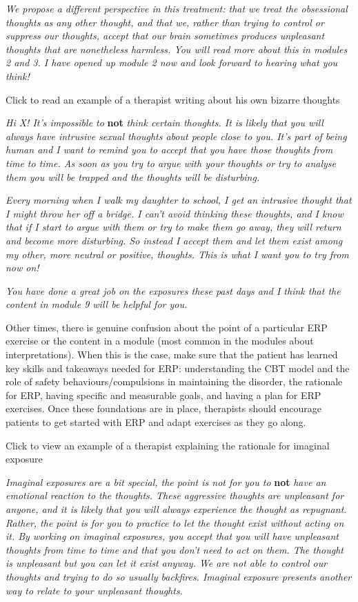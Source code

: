 \documentclass[]{book}
\begin{document}
\emph{We propose a different perspective in this treatment: that we treat the obsessional thoughts as any other thought, and that we, rather than trying to control or suppress our thoughts, accept that our brain sometimes produces unpleasant thoughts that are nonetheless harmless. You will read more about this in modules 2 and 3. I have opened up module 2 now and look forward to hearing what you think!}

 Click to read an example of a therapist writing about his own bizarre thoughts

\emph{Hi X! It's impossible to} \textbf{not} \emph{think certain thoughts. It is likely that you will always have intrusive sexual thoughts about people close to you. It's part of being human and I want to remind you to accept that you have those thoughts from time to time. As soon as you try to argue with your thoughts or try to analyse them you will be trapped and the thoughts will be disturbing.}

\emph{Every morning when I walk my daughter to school, I get an intrusive thought that I might throw her off a bridge. I can't avoid thinking these thoughts, and I know that if I start to argue with them or try to make them go away, they will return and become more disturbing. So instead I accept them and let them exist among my other, more neutral or positive, thoughts. This is what I want you to try from now on!}

\emph{You have done a great job on the exposures these past days and I think that the content in module 9 will be helpful for you.}

Other times, there is genuine confusion about the point of a particular ERP exercise or the content in a module (most common in the modules about interpretations). When this is the case, make sure that the patient has learned key skills and takeaways needed for ERP: understanding the CBT model and the role of safety behaviours/compulsions in maintaining the disorder, the rationale for ERP, having specific and measurable goals, and having a plan for ERP exercises. Once these foundations are in place, therapists should encourage patients to get started with ERP and adapt exercises as they go along.

 Click to view an example of a therapist explaining the rationale for imaginal exposure

\emph{Imaginal exposures are a bit special, the point is not for you to} \textbf{not} \emph{have an emotional reaction to the thoughts. These aggressive thoughts are unpleasant for anyone, and it is likely that you will always experience the thought as repugnant. Rather, the point is for you to practice to let the thought exist without acting on it. By working on imaginal exposures, you accept that you will have unpleasant thoughts from time to time and that you don't need to act on them. The thought is unpleasant but you can let it exist anyway. We are not able to control our thoughts and trying to do so usually backfires. Imaginal exposure presents another way to relate to your unpleasant thoughts.}
\end{document}
